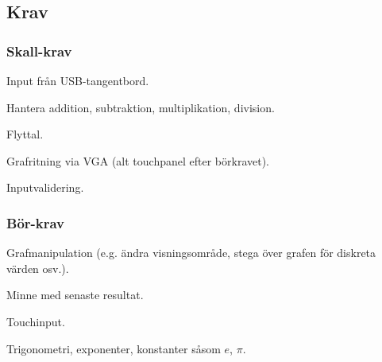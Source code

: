 \documentclass[a4paper]{article}
\begin{document}
\begin{multicols}{2}
\section*{Krav}
\subsubsection*{Skall-krav}
\begin{enumerate*}
\item Input från USB-tangentbord.
\item Hantera addition, subtraktion, multiplikation, division.
\item Flyttal.
\item Grafritning via VGA (alt touchpanel efter börkravet).
\item Inputvalidering.
\end{enumerate*}
\subsubsection*{Bör-krav}
\begin{enumerate*}
\item Grafmanipulation (e.g. ändra visningsområde, stega över grafen för diskreta värden osv.).
\item Minne med senaste resultat.
\item Touchinput.
\item Trigonometri, exponenter, konstanter såsom $e$, $\pi$.
\end{enumerate*}
\end{multicols}
\end{document}
